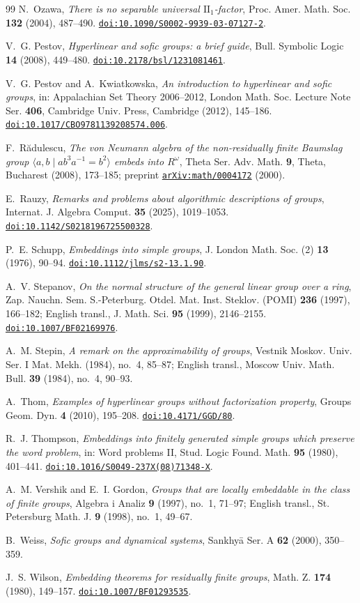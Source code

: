 \documentclass[11pt]{amsart}
\newcommand{\doi}[1]{\href{https://doi.org/#1}{\nolinkurl{doi:#1}}}
\newcommand{\arxiv}[1]{\href{https://arxiv.org/abs/#1}{\nolinkurl{arXiv:#1}}}
\begin{document}
\begin{thebibliography}{99}
N.~Ozawa, \emph{There is no separable universal $\mathrm{II}_1$-factor},
Proc. Amer. Math. Soc. \textbf{132} (2004), 487--490.
\doi{10.1090/S0002-9939-03-07127-2}.

V.~G. Pestov, \emph{Hyperlinear and sofic groups: a brief guide},
Bull. Symbolic Logic \textbf{14} (2008), 449--480.
\doi{10.2178/bsl/1231081461}.

V.~G. Pestov and A.~Kwiatkowska,
\emph{An introduction to hyperlinear and sofic groups},
in: Appalachian Set Theory 2006--2012, London Math. Soc. Lecture Note
Ser. \textbf{406}, Cambridge Univ. Press, Cambridge (2012), 145--186.
\doi{10.1017/CBO9781139208574.006}.

F.~R\u{a}dulescu, \emph{The von Neumann algebra of the non-residually
finite Baumslag group $\langle a,b\mid ab^3a^{-1}=b^2\rangle$ embeds into
$R^\omega$}, Theta Ser. Adv. Math. \textbf{9}, Theta, Bucharest (2008),
173--185; preprint \arxiv{math/0004172} (2000).

E.~Rauzy, \emph{Remarks and problems about algorithmic descriptions of
groups}, Internat. J. Algebra Comput. \textbf{35} (2025), 1019--1053.
\doi{10.1142/S0218196725500328}.

P.~E. Schupp, \emph{Embeddings into simple groups},
J. London Math. Soc. (2) \textbf{13} (1976), 90--94.
\doi{10.1112/jlms/s2-13.1.90}.

A.~V. Stepanov, \emph{On the normal structure of the general linear
group over a ring}, Zap. Nauchn. Sem. S.-Peterburg. Otdel. Mat. Inst. Steklov. (POMI) \textbf{236} (1997), 166--182;
English transl., J. Math. Sci. \textbf{95} (1999), 2146--2155.
\doi{10.1007/BF02169976}.

A.~M. Stepin, \emph{A remark on the approximability of groups},
Vestnik Moskov. Univ. Ser. I Mat. Mekh. (1984), no.~4, 85--87;
English transl., Moscow Univ. Math. Bull. \textbf{39} (1984), no.~4, 90--93.

A.~Thom, \emph{Examples of hyperlinear groups without factorization
property}, Groups Geom. Dyn. \textbf{4} (2010), 195--208.
\doi{10.4171/GGD/80}.

R.~J. Thompson, \emph{Embeddings into finitely generated simple groups
which preserve the word problem}, in: Word problems II, Stud. Logic Found.
Math. \textbf{95} (1980), 401--441.
\doi{10.1016/S0049-237X(08)71348-X}.

A.~M. Vershik and E.~I. Gordon,
\emph{Groups that are locally embeddable in the class of finite groups},
Algebra i Analiz \textbf{9} (1997), no.~1, 71--97; English transl.,
St. Petersburg Math. J. \textbf{9} (1998), no.~1, 49--67.

B.~Weiss, \emph{Sofic groups and dynamical systems}, Sankhy\={a} Ser. A
\textbf{62} (2000), 350--359.

J.~S. Wilson, \emph{Embedding theorems for residually finite groups},
Math. Z. \textbf{174} (1980), 149--157.
\doi{10.1007/BF01293535}.

\end{thebibliography}
\end{document}
